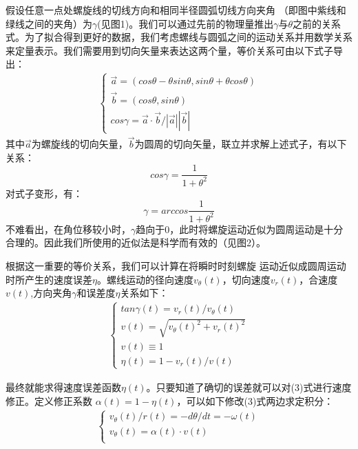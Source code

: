 \documentclass{cumcmthesis1}
\begin{document}
\par
假设任意一点处螺旋线的切线方向和相同半径圆弧切线方向夹角
（即图中紫线和绿线之间的夹角）为$ \gamma $(见图1)。我们可以通过先前的物理量推出$ \gamma $与$ \theta $之前的关系式。为了拟合得到更好的数据，我们考虑螺线与圆弧之间的运动关系并用数学关系来定量表示。我们需要用到切向矢量来表达这两个量，等价关系可由以下式子导出：
\begin{align}
    \begin{cases}
    \vec{a}  = ( cos{\theta}-{\theta}sin{\theta}, sin{\theta}+ {\theta}cos{\theta}  )\\
    \vec{b}  = (cos{\theta},  sin{\theta}   )\\
    cos{\gamma}  =\vec{a}\cdot\vec{b} /|\vec{a}| |\vec{b}| 
    \end{cases}
\end{align}
其中$\vec{a}$为螺旋线的切向矢量，$\vec{b}$为圆周的切向矢量，联立并求解上述式子，有以下关系：
\begin{equation}
    cos{\gamma} = \frac{1}{1+{\theta}^2}
\end{equation}
对式子变形，有：
\begin{equation}
    \gamma = arccos{\frac{1}{1+{\theta}^2}}
\end{equation}
不难看出，在角位移较小时，$\gamma$趋向于0，此时将螺旋运动近似为圆周运动是十分合理的。因此我们所使用的近似法是科学而有效的（见图2）。\par
根据这一重要的等价关系，我们可以计算在将瞬时时刻螺旋
运动近似成圆周运动时所产生的速度误差$ \eta $。螺线运动的径向速度$v_\theta(t)$，切向速度$v_r(t)$，合速度$v(t)$,方向夹角$\gamma$和误差度$\eta$关系如下：
\begin{align}
    \begin{cases}
    tan\gamma(t)=v_r(t)/v_\theta(t)\\
    v(t)=\sqrt{v_\theta(t)^2+v_r(t)^2}\\
    v(t)\equiv 1\\
    \eta(t)=1-v_r(t)/v(t)
    \end{cases}
\end{align}
\par
最终就能求得速度误差函数$ \eta(t)$。只要知道了确切的误差就可以对(3)式进行速度修正。定义修正系数
$\alpha(t)=1-\eta(t)$，可以如下修改(3)式两边求定积分：
\begin{align}
    \begin{cases}
    v_\theta(t)/ r(t)=-d \theta / dt=-\omega (t)\\
    v_\theta(t)=\alpha(t) \cdot v(t)\\
    \end{cases}
\end{align}
\end{document}
